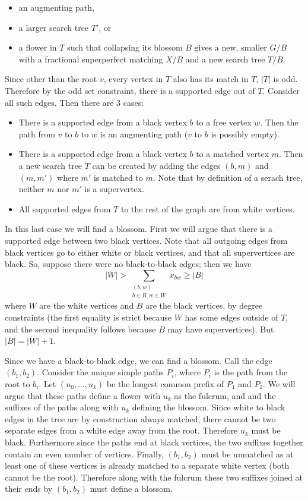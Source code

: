 \documentclass{hmcpset}
\begin{document}
\begin{solution}
\begin{enumerate}[label=(\Alph*)]
\begin{itemize} 
\item an augmenting path,
\item a larger search tree $T'$, or
\item a flower in $T$ such that collapsing its blossom $B$ gives a new,
      smaller $G/B$ with a fractional superperfect matching $X/B$ and a new search tree $T/B$.
\end{itemize}

Since other than the root $v$, every vertex in $T$ also has its match in $T$,
$|T|$ is odd.
Therefore by the odd set constraint, there is a supported edge out
of $T$. Consider all such edges. Then there are 3 cases:

\begin{itemize}
\item There is a supported edge from a black vertex $b$ to a free vertex $w$.
      Then the path from $v$ to $b$ to $w$ is an augmenting path ($v$ to $b$
      is possibly empty).
\item There is a supported edge from a black vertex $b$ to a matched vertex $m$.
      Then a new search tree $T$ can be created by adding the edges $(b,m)$ and
      $(m, m')$ where $m'$ is matched to $m$. Note that by definition of a serach
      tree, neither $m$ nor $m'$ is a supervertex.
\item All supported edges from $T$ to the rest of the graph are from white vertices.
\end{itemize}

In this last case we will find a blossom. First we will argue that there is a
supported edge between two black vertices. Note that all outgoing edges from
black vertices go to either white or black vertices, and that all
supervertices are black. So, suppose there were no black-to-black edges; then we have
\[|W| > \sum_{\substack{(b,w)\\ b \in B, w\in W}} x_{bw} \geq |B|\]
where $W$ are the white vertices and $B$ are the black vertices, by degree constraints
(the first equality is strict because $W$ has some edges outside of $T$, and the
second inequality follows because $B$ may have supervertices). But $|B| = |W| + 1$.

Since we have a black-to-black edge, we can find a blossom. Call the edge $(b_1, b_2)$.
Consider the unique simple paths $P_i$, where $P_i$ is the path from the root to $b_i$.
Let $(u_0,\ldots,u_k)$ be the longest common prefix of $P_1$ and $P_2$. We will argue
that these paths define a flower with $u_k$ as the fulcrum, and and the suffixes of
the paths along with $u_k$ defining the blossom. Since white to black edges in the tree
are by construction always matched, there cannot be two separate edges from a white
edge away from the root. Therefore $u_k$ must be black. Furthermore since the paths
end at black vertices, the two suffixes together contain an even number of vertices.
Finally, $(b_1, b_2)$ must be unmatched as at least one of these vertices is
already matched to a separate white vertex (both cannot be the root). Therefore
along with the fulcrum these two suffixes joined at their ends by $(b_1, b_2)$
must define a blossom. 


\end{enumerate}
\end{solution}
\end{document}
